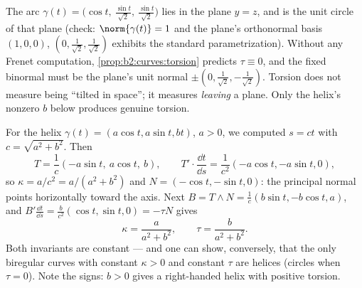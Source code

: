 \begin{example}
The arc $\gamma(t) = \bigl(\cos t,\ \tfrac{\sin t}{\sqrt2},\
\tfrac{\sin t}{\sqrt2}\bigr)$ lies in the plane $y = z$, and
is the unit circle of that plane (check: $\norm{\gamma(t)} =
1$ and the plane's orthonormal basis $(1,0,0)$,
$(0, \tfrac1{\sqrt2}, \tfrac1{\sqrt2})$ exhibits the standard
parametrization). Without any Frenet computation,
\cref{prop:b2:curves:torsion} predicts $\tau \equiv 0$, and
the fixed binormal must be the plane's unit normal $\pm(0,
\tfrac1{\sqrt2}, -\tfrac1{\sqrt2})$. Torsion does not measure
being ``tilted in space''; it measures \emph{leaving} a
plane. Only the helix's nonzero $b$ below produces genuine
torsion.
\end{example}

\begin{example}\label{ex:b2:curves:helixfrenet}
For the helix $\gamma(t) = (a\cos t, a\sin t, bt)$, $a > 0$, we
computed $s = ct$ with $c = \sqrt{a^2 + b^2}$. Then
\[
T = \frac1c(-a\sin t,\ a\cos t,\ b),
\qquad
T' \cdot \frac{\dd t}{\dd s}
= \frac{1}{c^2}(-a\cos t, -a\sin t, 0),
\]
so $\kappa = a/c^2 = a/(a^2 + b^2)$ and $N = (-\cos t, -\sin t,
0)$: the principal normal points horizontally toward the axis.
Next $B = T \wedge N = \frac1c(b\sin t, -b\cos t, a)$, and $B'
\frac{\dd t}{\dd s} = \frac{b}{c^2}(\cos t, \sin t, 0) = -\tau N$
gives
\[
\boxed{\ \kappa = \frac{a}{a^2 + b^2}, \qquad
\tau = \frac{b}{a^2 + b^2}. \ }
\]
Both invariants are constant --- and one can show, conversely, that
the only biregular curves with constant $\kappa > 0$ and constant
$\tau$ are helices (circles when $\tau = 0$). Note the signs: $b >
0$ gives a right-handed helix with positive torsion.
\end{example}


